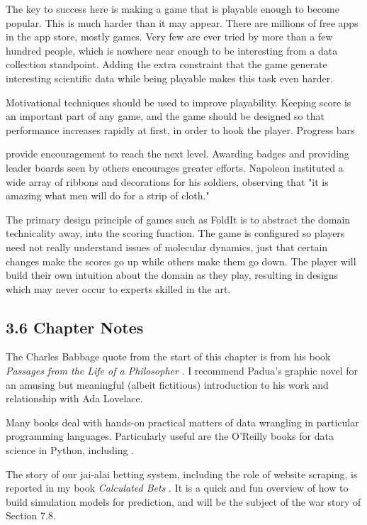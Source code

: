 \documentclass[10pt]{article}
\begin{document}
The key to success here is making a game that is playable enough to become popular. This is much harder than it may appear. There are millions of free apps in the app store, mostly games. Very few are ever tried by more than a few hundred people, which is nowhere near enough to be interesting from a data collection standpoint. Adding the extra constraint that the game generate interesting scientific data while being playable makes this task even harder.

Motivational techniques should be used to improve playability. Keeping score is an important part of any game, and the game should be designed so that performance increases rapidly at first, in order to hook the player. Progress bars


provide encouragement to reach the next level. Awarding badges and providing leader boards seen by others encourages greater efforts. Napoleon instituted a wide array of ribbons and decorations for his soldiers, observing that "it is amazing what men will do for a strip of cloth."

The primary design principle of games such as FoldIt is to abstract the domain technicality away, into the scoring function. The game is configured so players need not really understand issues of molecular dynamics, just that certain changes make the scores go up while others make them go down. The player will build their own intuition about the domain as they play, resulting in designs which may never occur to experts skilled in the art.

\subsection*{3.6 Chapter Notes}
The Charles Babbage quote from the start of this chapter is from his book \textit{Passages from the Life of a Philosopher} \cite{Bab11}. I recommend Padua's graphic novel \cite{Pad15} for an amusing but meaningful (albeit fictitious) introduction to his work and relationship with Ada Lovelace.

Many books deal with hands-on practical matters of data wrangling in particular programming languages. Particularly useful are the O'Reilly books for data science in Python, including \cite{Gru15, McK12}.

The story of our jai-alai betting system, including the role of website scraping, is reported in my book \textit{Calculated Bets} \cite{Ski01}. It is a quick and fun overview of how to build simulation models for prediction, and will be the subject of the war story of Section 7.8.
\end{document}
